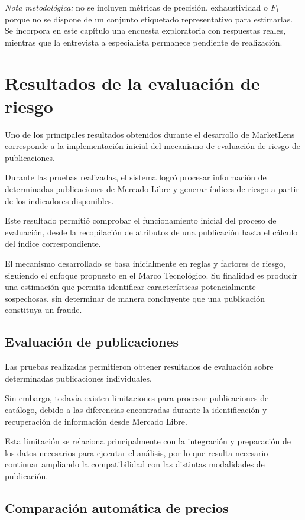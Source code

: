 \noindent\textit{Nota metodológica:} no se incluyen métricas de precisión, exhaustividad o $F_1$ porque no se dispone de un conjunto etiquetado representativo para estimarlas. Se incorpora en este capítulo una encuesta exploratoria con respuestas reales, mientras que la entrevista a especialista permanece pendiente de realización.

\section{Resultados de la evaluación de riesgo}

Uno de los principales resultados obtenidos durante el desarrollo de
MarketLens corresponde a la implementación inicial del mecanismo de
evaluación de riesgo de publicaciones.

Durante las pruebas realizadas, el sistema logró procesar información de
determinadas publicaciones de Mercado Libre y generar índices de riesgo
a partir de los indicadores disponibles.

Este resultado permitió comprobar el funcionamiento inicial del proceso
de evaluación, desde la recopilación de atributos de una publicación
hasta el cálculo del índice correspondiente.

El mecanismo desarrollado se basa inicialmente en reglas y factores de
riesgo, siguiendo el enfoque propuesto en el Marco Tecnológico. Su
finalidad es producir una estimación que permita identificar
características potencialmente sospechosas, sin determinar de manera
concluyente que una publicación constituya un fraude.

\subsection{Evaluación de publicaciones}

Las pruebas realizadas permitieron obtener resultados de evaluación
sobre determinadas publicaciones individuales.

Sin embargo, todavía existen limitaciones para procesar publicaciones de
catálogo, debido a las diferencias encontradas durante la identificación
y recuperación de información desde Mercado Libre.

Esta limitación se relaciona principalmente con la integración y
preparación de los datos necesarios para ejecutar el análisis, por lo
que resulta necesario continuar ampliando la compatibilidad con las
distintas modalidades de publicación.

\subsection{Comparación automática de precios}

